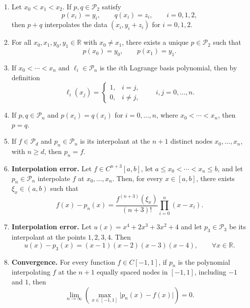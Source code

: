 \documentclass[a4paper]{article}
\begin{document}
\begin{enumerate}

    \item
        Let $x_0<x_1<x_2$. If $p,q\in\mathcal P_2$ satisfy
        \[
            p(x_i)=y_i,\qquad q(x_i)=z_i,\qquad i=0,1,2,
        \]
        then $p+q$ interpolates the data $(x_i,y_i+z_i)$ for $i=0,1,2$.

    \item
        For all $x_0,x_1,y_0,y_1\in\mathbb R$ with $x_0\ne x_1$, there exists a unique
        $p\in\mathcal P_2$ such that
        \[
            p(x_0)=y_0,\qquad p(x_1)=y_1.
        \]

    \item
        If $x_0<\dotsb<x_n$ and $\ell_i\in\mathcal P_n$ is the $i$th Lagrange basis polynomial,
        then by definition
        \[
            \ell_i(x_j)=
            \begin{cases}
                1, & i=j,\\
                0, & i\ne j,
            \end{cases}
            \qquad i,j=0,\dotsc,n.
        \]


    \item
        If $p,q\in\mathcal P_n$ and $p(x_i)=q(x_i)$ for $i=0,\dotsc,n$, where
        $x_0<\dotsb<x_n$, then $p=q$.

    \item
        If $f\in\mathcal P_d$ and $p_n\in\mathcal P_n$ is its interpolant at the $n+1$
        distinct nodes $x_0,\dotsc,x_n$, with $n\geq d$, then $p_n=f$.

    \item
        \textbf{Interpolation error.}
        Let $f\in C^{n+3}[a,b]$, let $a\leq x_0<\dotsb<x_n\leq b$, and let
        $p_n\in\mathcal P_n$ interpolate $f$ at $x_0,\dotsc,x_n$. Then, for every
        $x\in[a,b]$, there exists $\xi_x\in(a,b)$ such that
        \[
            f(x)-p_n(x)=
            \frac{f^{(n+3)}(\xi_x)}{(n+3)!}\prod_{i=0}^{n}(x-x_i).
        \]

    \item
        \textbf{Interpolation error.}
        Let $u(x)=x^4+2x^3+3x^2+4$ and let $p_3\in\mathcal P_3$ be its interpolant at
        the points $1,2,3,4$. Then
        \[
            u(x)-p_3(x)=(x-1)(x-2)(x-3)(x-4),\qquad \forall x\in\mathbb R.
        \]

    \item
        \textbf{Convergence.}
        For every function $f\in C[-1,1]$, if $p_n$ is the polynomial interpolating
        $f$ at the $n+1$ equally spaced nodes in $[-1,1]$, including $-1$ and $1$, then
        \[
            \lim_{n\to\infty} \left( \max_{x\in[-1,1]}\bigl\lvert p_n(x)-f(x)\bigr\rvert \right)=0.
        \]


\end{enumerate}
\end{document}
